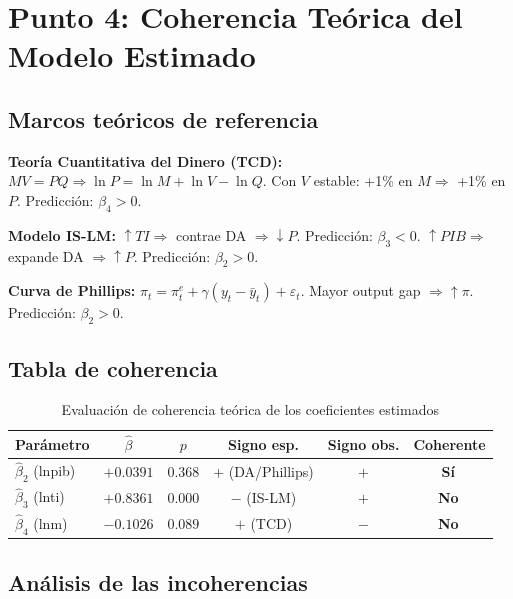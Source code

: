 \documentclass[12pt,a4paper]{article}
\newcommand\YES{\textcolor{verde_o}{\textbf{Sí\,\checkmark}}}
\newcommand\NOO{\textcolor{rojo_a}{\textbf{No\,\texttimes}}}
\begin{document}
\section{Punto 4: Coherencia Teórica del Modelo Estimado}

\subsection{Marcos teóricos de referencia}

\textbf{Teoría Cuantitativa del Dinero (TCD):}
$MV=PQ\Rightarrow\ln P=\ln M+\ln V-\ln Q$.
Con $V$ estable: +1\% en $M\Rightarrow$ +1\% en $P$. Predicción: $\beta_4>0$.

\textbf{Modelo IS-LM:}
$\uparrow TI\Rightarrow$ contrae DA $\Rightarrow\downarrow P$.
Predicción: $\beta_3<0$.
$\uparrow PIB\Rightarrow$ expande DA $\Rightarrow\uparrow P$.
Predicción: $\beta_2>0$.

\textbf{Curva de Phillips:}
$\pi_t=\pi_t^e+\gamma(y_t-\bar y_t)+\varepsilon_t$.
Mayor output gap $\Rightarrow\uparrow\pi$. Predicción: $\beta_2>0$.

\subsection{Tabla de coherencia}

\begin{table}[H]\centering
\caption{Evaluación de coherencia teórica de los coeficientes estimados}
\label{tab:coh}
\begin{tabular}{lccccc}
\toprule
\textbf{Parámetro} & $\hat\beta$ & $p$ & \textbf{Signo esp.} & \textbf{Signo obs.} & \textbf{Coherente}\\
\midrule
$\hat\beta_2$ (lnpib) & $+0.0391$ & $0.368$ & $+$ (DA/Phillips) & $+$ & \YES\\
$\hat\beta_3$ (lnti)  & $+0.8361$ & $0.000$ & $-$ (IS-LM) & $+$ & \NOO\\
$\hat\beta_4$ (lnm)   & $-0.1026$ & $0.089$ & $+$ (TCD) & $-$ & \NOO\\
\bottomrule
\end{tabular}
\end{table}

\subsection{Análisis de las incoherencias}
\end{document}
